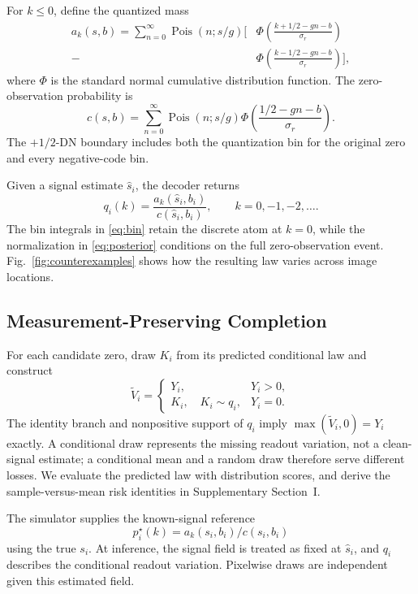 \documentclass[10pt,twocolumn,journal]{IEEEtran}
\begin{document}
For $k\leq0$, define the quantized mass
\begin{align}
a_k(s,b)=\sum_{n=0}^{\infty}\operatorname{Pois}(n;s/g)
\bigg[&\Phi\!\left(\frac{k+1/2-gn-b}{\sigma_r}\right)\nonumber\\[-2pt]
-&\Phi\!\left(\frac{k-1/2-gn-b}{\sigma_r}\right)\bigg],\label{eq:bin}
\end{align}
where $\Phi$ is the standard normal cumulative distribution function. The zero-observation probability is
\begin{equation}
c(s,b)=\sum_{n=0}^{\infty}\operatorname{Pois}(n;s/g)
\Phi\!\left(\frac{1/2-gn-b}{\sigma_r}\right).\label{eq:zeroevent}
\end{equation}
The $+1/2$-DN boundary includes both the quantization bin for the original zero and every negative-code bin.

Given a signal estimate $\hat s_i$, the decoder returns
\begin{equation}
q_i(k)=\frac{a_k(\hat s_i,b_i)}{c(\hat s_i,b_i)},\qquad k=0,-1,-2,\ldots.\label{eq:posterior}
\end{equation}
The bin integrals in \eqref{eq:bin} retain the discrete atom at $k=0$, while the normalization in \eqref{eq:posterior} conditions on the full zero-observation event. Fig.~\ref{fig:counterexamples} shows how the resulting law varies across image locations.

\subsection{Measurement-Preserving Completion}
For each candidate zero, draw $K_i$ from its predicted conditional law and construct
\begin{equation}
\widetilde V_i=\begin{cases}
Y_i,&Y_i>0,\\
K_i,\quad K_i\sim q_i,&Y_i=0.
\end{cases}\label{eq:output}
\end{equation}
The identity branch and nonpositive support of $q_i$ imply $\max(\widetilde V_i,0)=Y_i$ exactly. A conditional draw represents the missing readout variation, not a clean-signal estimate; a conditional mean and a random draw therefore serve different losses. We evaluate the predicted law with distribution scores, and derive the sample-versus-mean risk identities in Supplementary Section~I.

The simulator supplies the known-signal reference
\begin{equation}
p^{\star}_i(k)=a_k(s_i,b_i)/c(s_i,b_i)\label{eq:oracle}
\end{equation}
using the true $s_i$. At inference, the signal field is treated as fixed at $\hat s_i$, and $q_i$ describes the conditional readout variation. Pixelwise draws are independent given this estimated field.
\end{document}
